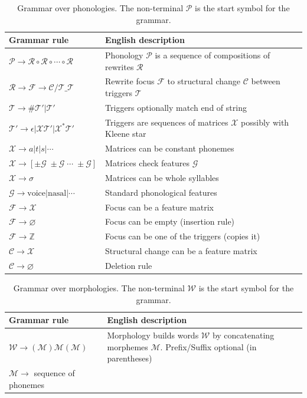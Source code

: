 \documentclass{article}
\begin{document}
\begin{table}[h]
\centering
\begin{tabular*}{\textwidth}{ll}
\toprule
Grammar rule  & English description \\\midrule
$\mathcal{P}\to \mathcal{R}\circ \mathcal{R}\circ \cdots \circ \mathcal{R}$&Phonology $\mathcal{P}$ is a sequence of compositions of rewrites $\mathcal{R}$\\
$\mathcal{R}\to \mathcal{F}\longrightarrow \mathcal{C} / \mathcal{T}\_\mathcal{T}$& Rewrite focus $\mathcal{F}$ to structural change $\mathcal{C}$ between triggers $\mathcal{T}$\\
$\mathcal{T}\to \# \mathcal{T}' | \mathcal{T}'$ & Triggers optionally match end of string\\
$\mathcal{T}'\to \epsilon | \mathcal{X} \mathcal{T}' | \mathcal{X}^* \mathcal{T}'$ & Triggers are sequences of matrices $\mathcal{X}$ possibly with Kleene star\\
$\mathcal{X}\to a|t|s|\cdots$&Matrices can be constant phonemes\\
$\mathcal{X}\to [\pm \mathcal{G} \; \pm \mathcal{G} \; \cdots \; \pm \mathcal{G}]$& Matrices check features $\mathcal{G}$\\
$\mathcal{X}\to \sigma$&Matrices can be whole syllables\\
$\mathcal{G}\to \text{voice}|\text{nasal}|\cdots$&Standard phonological features\\
$\mathcal{F}\to \mathcal{X}$&Focus can be a feature matrix\\
$\mathcal{F}\to \varnothing$&Focus can be empty (insertion rule)\\
$\mathcal{F}\to\mathbb{Z}$&Focus can be one of the triggers (copies it)\\
$\mathcal{C}\to\mathcal{X}$&Structural change can be a feature matrix\\
$\mathcal{C}\to\varnothing$&Deletion rule\\
\bottomrule
\end{tabular*}
\caption{Grammar over phonologies. The non-terminal $\mathcal{P}$ is the start symbol for the grammar.}
\label{phonologyGrammar}
\end{table}

\begin{table}[h]
\centering
\begin{tabular*}{\textwidth}{ll}
\toprule
Grammar rule  & English description \\\midrule
$\mathcal{W}\to (\mathcal{M}) \mathcal{M} (\mathcal{M})$&Morphology builds words $\mathcal{W}$ by concatenating morphemes $\mathcal{M}$. Prefix/Suffix optional (in parentheses)\\
$\mathcal{M}\to$ sequence of phonemes\bottomrule
\end{tabular*}
\caption{Grammar over morphologies. The non-terminal $\mathcal{W}$ is the start symbol for the grammar.}
\label{morphologyGrammar}
\end{table}
\end{document}
